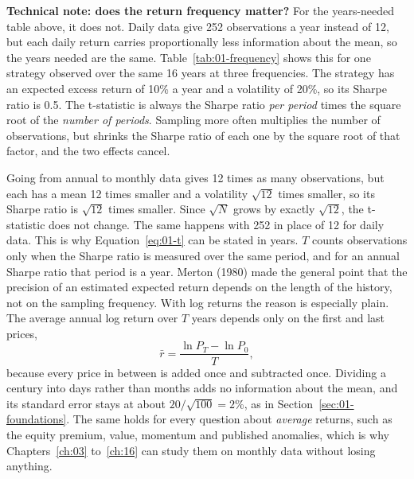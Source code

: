 \begin{technote}
\textbf{Technical note: does the return frequency matter?} For the years-needed table above, it does not. Daily data give 252 observations a year instead of 12, but each daily return carries proportionally less information about the mean, so the years needed are the same. Table~\ref{tab:01-frequency} shows this for one strategy observed over the same 16 years at three frequencies. The strategy has an expected excess return of 10\% a year and a volatility of 20\%, so its Sharpe ratio is 0.5. The t-statistic is always the Sharpe ratio \emph{per period} times the square root of the \emph{number of periods}. Sampling more often multiplies the number of observations, but shrinks the Sharpe ratio of each one by the square root of that factor, and the two effects cancel.


Going from annual to monthly data gives 12 times as many observations, but each has a mean 12 times smaller and a volatility $\sqrt{12}$ times smaller, so its Sharpe ratio is $\sqrt{12}$ times smaller. Since $\sqrt{N}$ grows by exactly $\sqrt{12}$, the t-statistic does not change. The same happens with 252 in place of 12 for daily data. This is why Equation~\eqref{eq:01-t} can be stated in years. $T$ counts observations only when the Sharpe ratio is measured over the same period, and for an annual Sharpe ratio that period is a year. Merton (1980) made the general point that the precision of an estimated expected return depends on the length of the history, not on the sampling frequency. With log returns the reason is especially plain. The average annual log return over $T$ years depends only on the first and last prices,
\begin{equation}
  \bar{r} = \frac{\ln P_T - \ln P_0}{T}, \nonumber
\end{equation}
because every price in between is added once and subtracted once. Dividing a century into days rather than months adds no information about the mean, and its standard error stays at about $20/\sqrt{100} = 2$\%, as in Section~\ref{sec:01-foundations}. The same holds for every question about \emph{average} returns, such as the equity premium, value, momentum and published anomalies, which is why Chapters~\ref{ch:03} to~\ref{ch:16} can study them on monthly data without losing anything.


\end{technote}
